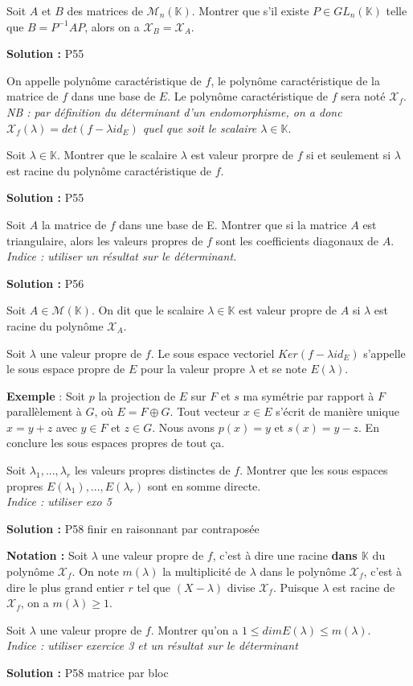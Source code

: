 \documentclass[12pt,a4paper]{article}
\newcommand{\K}{\mathbb{K}}
\newcommand{\Mm}{\mathcal{M}}
\newcommand{\Chi}{\mathcal{X}}
\def\be{\begin{exo}}
\def\ee{\end{exo}}
\def\bd{\begin{df}}
\def\ed{\end{df}}
\newcommand{\solution}[1]{\par\noindent\textbf{\color{OliveGreen}Solution :} \textcolor{OliveGreen}{#1}}
\begin{document}
\be
Soit $A$ et $B$ des matrices de $\Mm_n(\K)$. Montrer que s'il existe $P \in GL_n(\K)$ telle que $B = P^{-1}AP$, alors on a $\Chi_B = \Chi_A$.
\solution{P55}
\ee

\bd
On appelle polynôme caractéristique de $f$, le polynôme caractéristique de la matrice de $f$ dans une base de $E$. Le polynôme caractéristique de $f$ sera noté $\Chi_f$.\\
\textit{NB : par définition du déterminant d'un endomorphisme, on a donc $\Chi_f(\lambda) = det(f - \lambda id_E)$ quel que soit le scalaire $\lambda \in \K$}.
\ed

\be
Soit $\lambda \in \K$. Montrer que le scalaire $\lambda$ est valeur prorpre de $f$ si et seulement si $\lambda$ est racine du polynôme caractéristique de $f$.
\solution{P55}
\ee

\be
Soit $A$ la matrice de $f$ dans une base de E. Montrer que si la matrice $A$ est triangulaire, alors les valeurs propres de $f$ sont les coefficients diagonaux de $A$.\\
\color{gray}\textit{Indice : utiliser un résultat sur le déterminant.}
\solution{P56}
\ee
\bd
Soit $A \in \Mm(\K)$. 
 On dit que le scalaire $\lambda \in \K$ est valeur propre de $A$ si $\lambda$ est racine du polynôme $\Chi_A$.
 \ed
\bd
Soit $\lambda$ une valeur propre de $f$. Le sous espace vectoriel $Ker(f-\lambda id_E)$ s'appelle le sous espace propre de $E$ pour la valeur propre $\lambda$ et se note $E(\lambda)$.
\ed
\textbf{Exemple} : Soit $p$ la projection de $E$ sur $F$ et $s$ ma symétrie par rapport à $F$ parallèlement à $G$, où $E = F \oplus G$. Tout vecteur $x\in E$ s'écrit de manière unique $x = y+z$ avec $y \in F$ et $z \in G$. 
Nous avons $p(x) = y$ et $s(x) = y-z$. En conclure les sous espaces propres de tout ça.

\be
Soit $\lambda_1,...,\lambda_r$ les valeurs propres distinctes de $f$. Montrer que les sous espaces propres $E(\lambda_1),...,E(\lambda_r)$ sont en somme directe.\\
\color{gray}\textit{Indice : utiliser exo 5}
\solution{P58 \color{white} finir en raisonnant par contraposée}
\ee

\textbf{Notation : } Soit $\lambda$ une valeur propre de $f$, c'est à dire une racine \textbf{dans $\K$} du polynôme $\Chi_f$. On note $m(\lambda)$ la multiplicité de $\lambda$ dans le polynôme $\Chi_f$, c'est à dire le plus grand entier $r$ tel que $(X-\lambda)$ divise $\Chi_f$. Puisque $\lambda$ est racine de $\Chi_f$, on a $m(\lambda) \geq 1$.

\be
Soit $\lambda$ une valeur propre de $f$. Montrer qu'on a $1 \leq dimE(\lambda) \leq m(\lambda).$\\
\color{gray}\textit{Indice : utiliser exercice 3 et un résultat sur le déterminant}
\solution{P58 \color{white} matrice par bloc}
\ee
\end{document}
